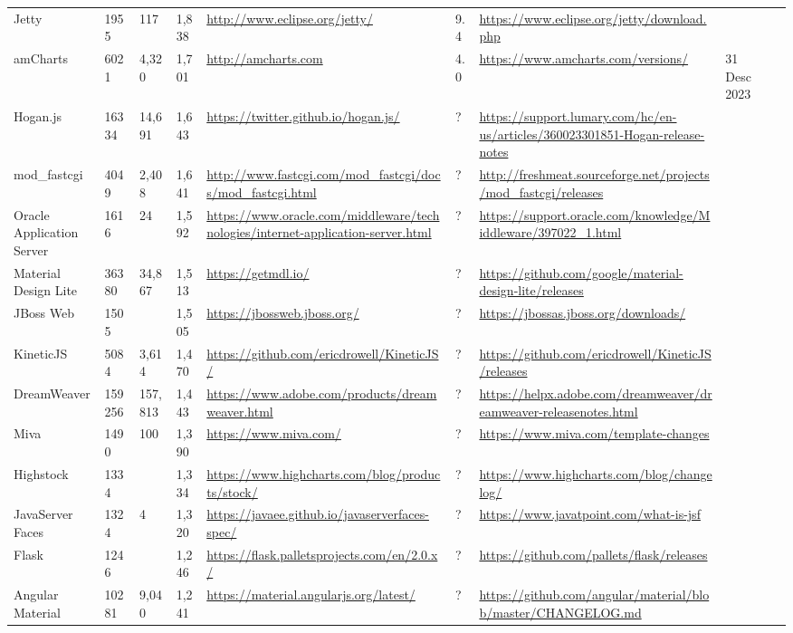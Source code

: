 \begin{table}[!htp]
\begin{tabular}{|l|l|l|l|l|l|l|l|l|}
				Jetty &1955 &117 &1,838 &\ul{http://www.eclipse.org/jetty/} &9.4 &\ul{https://www.eclipse.org/jetty/download.php} & \\
				amCharts &6021 &4,320 &1,701 &\ul{http://amcharts.com} &4.0 &\ul{https://www.amcharts.com/versions/} &31 Desc 2023 \\
				Hogan.js &16334 &14,691 &1,643 &\ul{https://twitter.github.io/hogan.js/} &? &\ul{https://support.lumary.com/hc/en-us/articles/360023301851-Hogan-release-notes} & \\
				mod\_fastcgi &4049 &2,408 &1,641 &\ul{http://www.fastcgi.com/mod\_fastcgi/docs/mod\_fastcgi.html} &? &\ul{http://freshmeat.sourceforge.net/projects/mod\_fastcgi/releases} & \\
				Oracle Application Server &1616 &24 &1,592 &\ul{https://www.oracle.com/middleware/technologies/internet-application-server.html} &? &\ul{https://support.oracle.com/knowledge/Middleware/397022\_1.html} & \\
				Material Design Lite &36380 &34,867 &1,513 &\ul{https://getmdl.io/} &? &\ul{https://github.com/google/material-design-lite/releases} & \\
				JBoss Web &1505 & &1,505 &\ul{https://jbossweb.jboss.org/} &? &\ul{https://jbossas.jboss.org/downloads/} & \\
				KineticJS &5084 &3,614 &1,470 &\ul{https://github.com/ericdrowell/KineticJS/} &? &\ul{https://github.com/ericdrowell/KineticJS/releases} & \\
				DreamWeaver &159256 &157,813 &1,443 &\ul{https://www.adobe.com/products/dreamweaver.html} &? &\ul{https://helpx.adobe.com/dreamweaver/dreamweaver-releasenotes.html} & \\
				Miva &1490 &100 &1,390 &\ul{https://www.miva.com/} &? &\ul{https://www.miva.com/template-changes} & \\
				Highstock &1334 & &1,334 &\ul{https://www.highcharts.com/blog/products/stock/} &? &\ul{https://www.highcharts.com/blog/changelog/} & \\
				JavaServer Faces &1324 &4 &1,320 &\ul{https://javaee.github.io/javaserverfaces-spec/} &? &\ul{https://www.javatpoint.com/what-is-jsf} & \\
				Flask &1246 & &1,246 &\ul{https://flask.palletsprojects.com/en/2.0.x/} &? &\ul{https://github.com/pallets/flask/releases} & \\
				Angular Material &10281 &9,040 &1,241 &\ul{https://material.angularjs.org/latest/} &? &\ul{https://github.com/angular/material/blob/master/CHANGELOG.md} & \\

\end{tabular}
\end{table}
